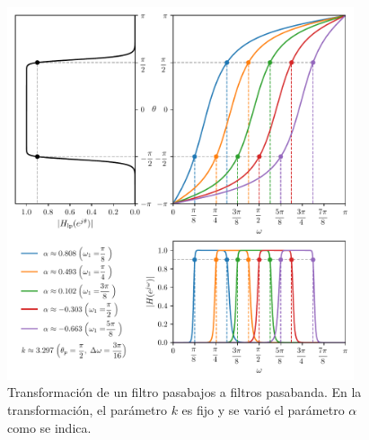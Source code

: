 \documentclass[a4paper]{report}
\begin{document}
\begin{figure}[!htb]
 \begin{center}
 \includegraphics[width=0.91\textwidth]{figuras/filter_design_frequency_transformations_low_bandpass_alpha.pdf}
 \caption{\label{fig:filter_design_frequency_transformations_low_bandpass_alpha} Transformación de un filtro pasabajos a filtros pasabanda. En la transformación, el parámetro \(k\) es fijo y se varió el parámetro \(\alpha\) como se indica.}
 \end{center}
\end{figure}
\end{document}
